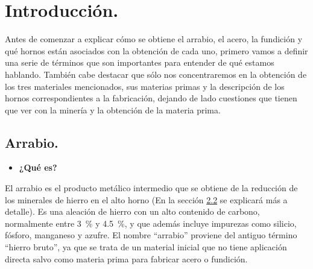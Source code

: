 \documentclass[12pt,a4paper]{article}
\begin{document}

\tableofcontents

\begin{abstract}
    \underline{\textbf{Requerimiento del Trabajo:}} Investigue los métodos de obtención de arrabio, acero y fundición a fin de adquirir la capacidad de explicar conceptualmente los mismos. La actividad requerida incluye la identificación del tipo y uso de los hornos asociados a dichos métodos de obtención. [NOTA: A modo de orientación, puede consultar la siguiente fuente de información:]
    \begin{itemize}
        \item Aguilar Schafer, J.A. Yacimientos minerales y procesos geológicos.
        \item Aguilar Schafer, J.A. Explotación minera, preparación y concentración.
        \item Aguilar Schafer, J.A. Metalurgia extractiva del hierro.
        \item Aguilar Schafer, J.A. Hornos Industriales.
    \end{itemize}
\end{abstract}

\section{Introducción.}
Antes de comenzar a explicar cómo se obtiene el arrabio, el acero, la fundición y qué hornos están asociados con la obtención de cada uno, primero vamos a definir una serie de términos que son importantes para entender de qué estamos hablando. También cabe destacar que sólo nos concentraremos en la obtención de los tres materiales mencionados, sus materias primas y la descripción de los hornos correspondientes a la fabricación, dejando de lado cuestiones que tienen que ver con la minería y la obtención de la materia prima.

\subsection{Arrabio.}
\begin{itemize}
    \item \textbf{¿Qué es?}
\end{itemize}

El arrabio es el producto metálico intermedio que se obtiene de la reducción de los minerales de hierro en el alto horno (En la sección \hyperref[alto_horno]{2.2} se explicará más a detalle). Es una aleación de hierro con un alto contenido de carbono, normalmente entre \SI{3}{\percent} y \SI{4,5}{\percent}, y que además incluye impurezas como silicio, fósforo, manganeso y azufre. El nombre “arrabio” proviene del antiguo término “hierro bruto”, ya que se trata de un material inicial que no tiene aplicación directa salvo como materia prima para fabricar acero o fundición.
\end{document}
